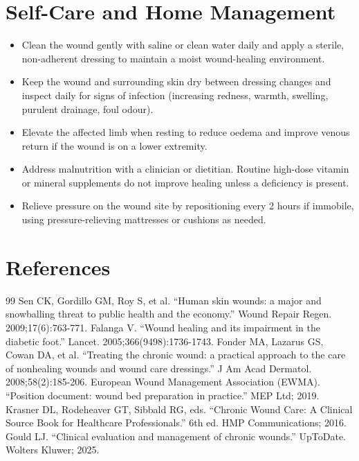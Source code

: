 \section*{Self-Care and Home Management}
\begin{itemize}
  \item Clean the wound gently with saline or clean water daily and apply a sterile, non-adherent dressing to maintain a moist wound-healing environment.
  \item Keep the wound and surrounding skin dry between dressing changes and inspect daily for signs of infection (increasing redness, warmth, swelling, purulent drainage, foul odour).
  \item Elevate the affected limb when resting to reduce oedema and improve venous return if the wound is on a lower extremity.
  \item Address malnutrition with a clinician or dietitian. Routine high-dose vitamin or mineral supplements do not improve healing unless a deficiency is present.
  \item Relieve pressure on the wound site by repositioning every 2 hours if immobile, using pressure-relieving mattresses or cushions as needed.
\end{itemize}

\section*{References}
\begin{thebibliography}{99}
 Sen CK, Gordillo GM, Roy S, et al. ``Human skin wounds: a major and snowballing threat to public health and the economy.'' Wound Repair Regen. 2009;17(6):763-771.
 Falanga V. ``Wound healing and its impairment in the diabetic foot.'' Lancet. 2005;366(9498):1736-1743.
 Fonder MA, Lazarus GS, Cowan DA, et al. ``Treating the chronic wound: a practical approach to the care of nonhealing wounds and wound care dressings.'' J Am Acad Dermatol. 2008;58(2):185-206.
 European Wound Management Association (EWMA). ``Position document: wound bed preparation in practice.'' MEP Ltd; 2019.
 Krasner DL, Rodeheaver GT, Sibbald RG, eds. ``Chronic Wound Care: A Clinical Source Book for Healthcare Professionals.'' 6th ed. HMP Communications; 2016.
 Gould LJ. ``Clinical evaluation and management of chronic wounds.'' UpToDate. Wolters Kluwer; 2025.
\end{thebibliography}

